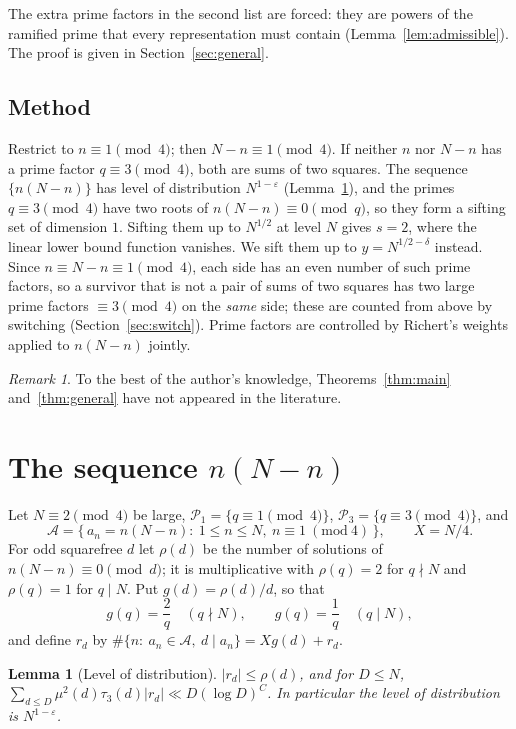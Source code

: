 \documentclass[11pt]{amsart}
\newtheorem{lemma}[theorem]{Lemma}
\theoremstyle{remark}
\newtheorem{remark}[theorem]{Remark}
\newcommand{\cA}{\mathcal{A}}
\newcommand{\cP}{\mathcal{P}}
\begin{document}
The extra prime factors in the second list are forced: they are powers of the ramified prime that every
representation must contain (Lemma~\ref{lem:admissible}). The proof is given in Section~\ref{sec:general}.

\subsection*{Method}
Restrict to $n\equiv1\pmod4$; then $N-n\equiv1\pmod4$. If neither $n$ nor $N-n$ has a prime factor
$q\equiv3\pmod 4$, both are sums of two squares. The sequence $\{n(N-n)\}$ has level of distribution
$N^{1-\varepsilon}$ (Lemma~\ref{lem:level}), and the primes $q\equiv3\pmod4$ have two roots of
$n(N-n)\equiv0\pmod q$, so they form a sifting set of dimension $1$. Sifting them up to $N^{1/2}$ at level
$N$ gives $s=2$, where the linear lower bound function vanishes. We sift them up to $y=N^{1/2-\delta}$ instead.
Since $n\equiv N-n\equiv1\pmod 4$, each side has an even number of such prime factors, so a survivor that is
not a pair of sums of two squares has two large prime factors $\equiv3\pmod4$ on the \emph{same} side; these
are counted from above by switching (Section~\ref{sec:switch}). Prime factors are controlled by Richert's
weights applied to $n(N-n)$ jointly.

\begin{remark}
To the best of the author's knowledge, Theorems~\ref{thm:main} and~\ref{thm:general} have not appeared in
the literature.
\end{remark}

\section{The sequence $n(N-n)$}\label{sec:level}

Let $N\equiv 2\pmod 4$ be large, $\cP_1=\{q\equiv1\pmod4\}$, $\cP_3=\{q\equiv3\pmod4\}$, and
\[
\cA=\{\,a_n=n(N-n):\ 1\le n\le N,\ n\equiv1\ (\mathrm{mod}\ 4)\,\},\qquad X=N/4.
\]
For odd squarefree $d$ let $\rho(d)$ be the number of solutions of $n(N-n)\equiv0\pmod d$; it is
multiplicative with $\rho(q)=2$ for $q\nmid N$ and $\rho(q)=1$ for $q\mid N$. Put $g(d)=\rho(d)/d$, so that
\[
g(q)=\frac2q\quad(q\nmid N),\qquad g(q)=\frac1q\quad(q\mid N),
\]
and define $r_d$ by $\#\{n:\ a_n\in\cA,\ d\mid a_n\}=Xg(d)+r_d$.

\begin{lemma}[Level of distribution]\label{lem:level}
$|r_d|\le\rho(d)$, and for $D\le N$,
$\sum_{d\le D}\mu^2(d)\tau_3(d)|r_d|\ll D(\log D)^{C}$. In particular the level of distribution is
$N^{1-\varepsilon}$.
\end{lemma}
\end{document}

